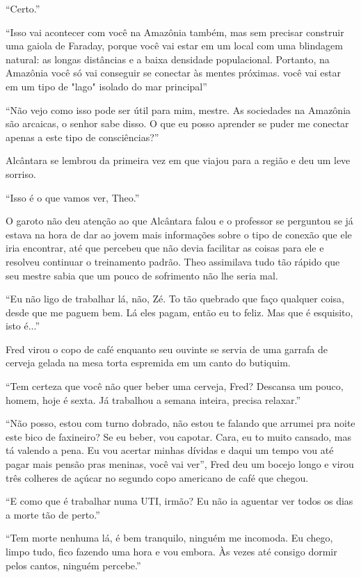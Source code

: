 ``Certo.''

``Isso vai acontecer com você na Amazônia também, mas sem precisar
construir uma gaiola de Faraday, porque você vai estar em um local com
uma blindagem natural: as longas distâncias e a baixa densidade
populacional. Portanto, na Amazônia você só vai conseguir se conectar às
mentes próximas. você vai estar em um tipo de "lago" isolado do mar
principal''

``Não vejo como isso pode ser útil para mim, mestre. As sociedades na
Amazônia são arcaicas, o senhor sabe disso. O que eu posso aprender se
puder me conectar apenas a este tipo de consciências?''

Alcântara se lembrou da primeira vez em que viajou para a região e deu
um leve sorriso.

``Isso é o que vamos ver, Theo.''

O garoto não deu atenção ao que Alcântara falou e o professor se
perguntou se já estava na hora de dar ao jovem mais informações sobre o
tipo de conexão que ele iria encontrar, até que percebeu que não devia
facilitar as coisas para ele e resolveu continuar o treinamento padrão.
Theo assimilava tudo tão rápido que seu mestre sabia que um pouco de
sofrimento não lhe seria mal.

\asterisc

``Eu não ligo de trabalhar lá, não, Zé. To tão quebrado que faço
qualquer coisa, desde que me paguem bem. Lá eles pagam, então eu to
feliz. Mas que é esquisito, isto é...''

Fred virou o copo de café enquanto seu ouvinte se servia de uma garrafa
de cerveja gelada na mesa torta espremida em um canto do butiquim.

``Tem certeza que você não quer beber uma cerveja, Fred? Descansa um
pouco, homem, hoje é sexta. Já trabalhou a semana inteira, precisa
relaxar.''

``Não posso, estou com turno dobrado, não estou te falando que arrumei
pra noite este bico de faxineiro? Se eu beber, vou capotar. Cara, eu to
muito cansado, mas tá valendo a pena. Eu vou acertar minhas dívidas e
daqui um tempo vou até pagar mais pensão pras meninas, você vai ver'',
Fred deu um bocejo longo e virou três colheres de açúcar no segundo copo
americano de café que chegou.

``E como que é trabalhar numa UTI, irmão? Eu não ia aguentar ver todos
os dias a morte tão de perto.''

``Tem morte nenhuma lá, é bem tranquilo, ninguém me incomoda. Eu chego,
limpo tudo, fico fazendo uma hora e vou embora. Às vezes até consigo
dormir pelos cantos, ninguém percebe.''

